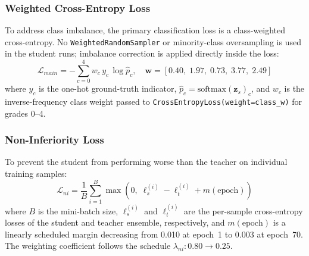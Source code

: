 \documentclass[a4paper,fleqn]{cas-dc}
\begin{document}
                    \subsubsection{Weighted Cross-Entropy Loss}
                    To address class imbalance, the primary classification loss is a class-weighted cross-entropy. No \texttt{WeightedRandomSampler} or minority-class oversampling is used in the student runs; imbalance correction is applied directly inside the loss:
                    \begin{equation}
                      \mathcal{L}_{main} = -\sum_{c=0}^{4} w_c\, y_c\, \log\hat{p}_c, \quad
                        \mathbf{w} = [0.40,\;1.97,\;0.73,\;3.77,\;2.49]
                        \end{equation}
                        where $y_c$ is the one-hot ground-truth indicator, $\hat{p}_c = \text{softmax}(\mathbf{z}_s)_c$, and $w_c$ is the inverse-frequency class weight passed to \texttt{CrossEntropyLoss(weight=class\_w)} for grades 0--4.

                        \subsubsection{Non-Inferiority Loss}
                        To prevent the student from performing worse than the teacher on individual training samples:
                        \begin{equation}
                          \mathcal{L}_{ni} = \frac{1}{B}\sum_{i=1}^{B}
                            \max\!\left(0,\; \ell_s^{(i)} - \ell_t^{(i)} + m(\text{epoch})\right)
                            \end{equation}
                            where $B$ is the mini-batch size, $\ell_s^{(i)}$ and $\ell_t^{(i)}$ are the per-sample cross-entropy losses of the student and teacher ensemble, respectively, and $m(\text{epoch})$ is a linearly scheduled margin decreasing from 0.010 at epoch~1 to 0.003 at epoch~70. The weighting coefficient follows the schedule $\lambda_{ni}: 0.80 \to 0.25$.
\end{document}
